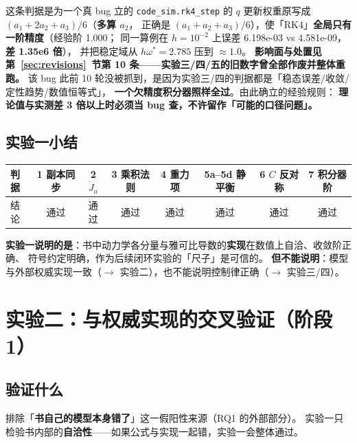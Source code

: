 \documentclass[11pt,a4paper]{ctexart}
\begin{document}
\begin{warnbox}{这条判据是为一个真 bug 立的}
\texttt{code\_sim.rk4\_step} 的 $q$ 更新权重原写成 $(a_1+2a_2+a_3)/6$（\textbf{多算 $a_2$}，
正确是 $(a_1+a_2+a_3)/6$），使「RK4」\textbf{全局只有一阶精度}（经验阶 1.000；
同一算例在 $h=10^{-2}$ 上误差 6.198e-03 vs 4.581e-09，\textbf{差 1.35e6 倍}），
并把稳定域从 $h\omega^*=2.785$ 压到 $\approx1.0$。
\textbf{影响面与处置见第~\ref{sec:revisions}~节第 10 条——实验三/四/五的旧数字曾全部作废并整体重跑。}
该 bug 此前 10 轮没被抓到，是因为实验三/四的判据都是「稳态误差/收敛/定性趋势/数值恒等式」，
\textbf{一个欠精度积分器照样全过}。由此确立的经验规则：
\textbf{理论值与实测差 3 倍以上时必须当 bug 查，不许留作「可能的口径问题」。}
\end{warnbox}

\subsection{实验一小结}

\begin{table}[H]
\centering
\small
\begin{tabular}{@{}lccccccc@{}}
\toprule
判据 & 1 副本同步 & 2 $\dot J_a$ & 3 乘积法则 & 4 重力项 & 5a--5d 静平衡 & 6 $C$ 反对称 & 7 积分器阶 \\
\midrule
结论 & 通过 & 通过 & 通过 & 通过 & 通过 & 通过 & 通过 \\
\bottomrule
\end{tabular}
\end{table}

\textbf{实验一说明的是}：书中动力学各分量与雅可比导数的\textbf{实现}在数值上自洽、收敛阶正确、
符号约定明确，作为后续闭环实验的「尺子」是可信的。
\textbf{但不能说明}：模型与外部权威实现一致（$\to$ 实验二），也不能说明控制律正确（$\to$ 实验三/四）。

\section{实验二：与权威实现的交叉验证（阶段 1）}\label{sec:exp2}

\subsection{验证什么}

排除「\textbf{书自己的模型本身错了}」这一假阳性来源（RQ1 的外部部分）。
实验一只检验书内部的\textbf{自洽性}——如果公式与实现一起错，实验一会整体通过。
\end{document}
